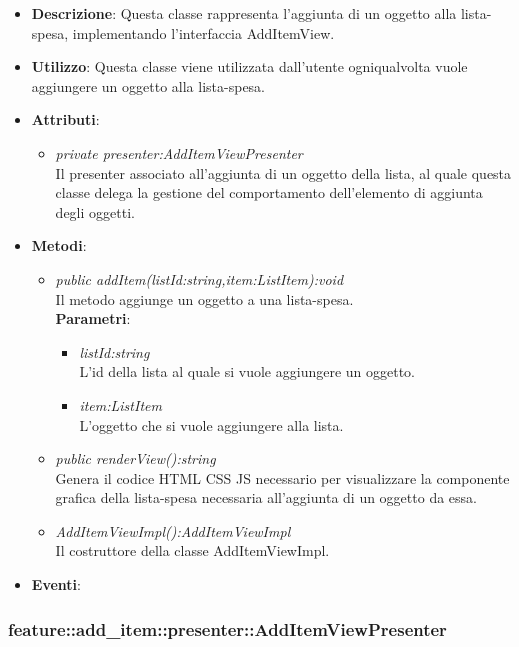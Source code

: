 \begin{itemize}
\item \textbf{Descrizione}: Questa classe rappresenta l'aggiunta di un oggetto alla lista-spesa, implementando l'interfaccia AddItemView.
\item \textbf{Utilizzo}: Questa classe viene utilizzata dall'utente ogniqualvolta vuole aggiungere un oggetto alla lista-spesa.
\item \textbf{Attributi}: 
	\begin{itemize}
	\item \textit{private presenter:AddItemViewPresenter}\\
	Il presenter associato all'aggiunta di un oggetto della lista, al quale questa classe delega la gestione del comportamento dell'elemento di aggiunta degli oggetti.
	\end{itemize}
\item \textbf{Metodi}:
	\begin{itemize}
	\item \textit{public addItem(listId:string,item:ListItem):void}\\
	Il metodo aggiunge un oggetto a una lista-spesa.
			\\ \textbf{Parametri}: \begin{itemize}
			\item \textit{listId:string}\\
			L'id della lista al quale si vuole aggiungere un oggetto.
			\item \textit{item:ListItem}\\
			L'oggetto che si vuole aggiungere alla lista.
			\end{itemize} 
	\item \textit{public renderView():string}\\
	Genera il codice HTML CSS JS necessario per visualizzare la componente grafica della lista-spesa necessaria all'aggiunta di un oggetto da essa.
	\item \textit{AddItemViewImpl():AddItemViewImpl}\\
	Il costruttore della classe AddItemViewImpl.
	\end{itemize}
\item \textbf{Eventi}:
\end{itemize}

\subsubsection{feature::add\_item::presenter::AddItemViewPresenter}

